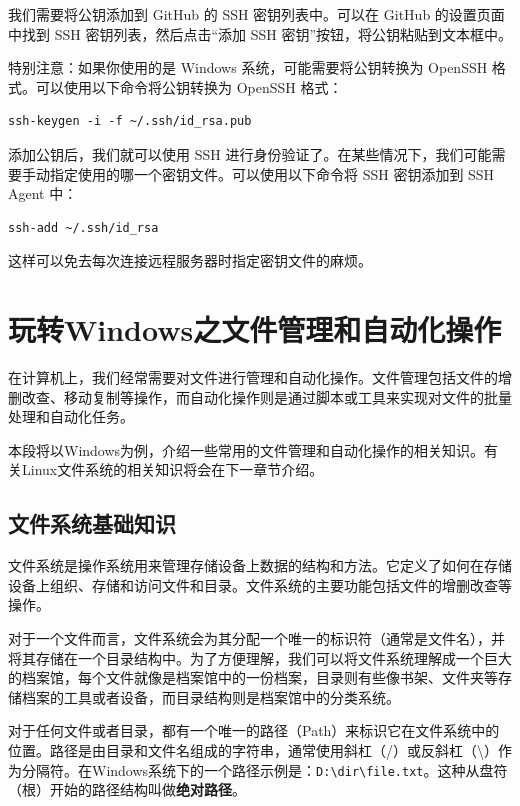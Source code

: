 \documentclass[../main.tex]{subfiles}
\begin{document}
我们需要将公钥添加到 GitHub 的 SSH 密钥列表中。可以在 GitHub 的设置页面中找到 SSH 密钥列表，然后点击“添加 SSH 密钥”按钮，将公钥粘贴到文本框中。

特别注意：如果你使用的是 Windows 系统，可能需要将公钥转换为 OpenSSH 格式。可以使用以下命令将公钥转换为 OpenSSH 格式：
\begin{verbatim}
ssh-keygen -i -f ~/.ssh/id_rsa.pub
\end{verbatim}

添加公钥后，我们就可以使用 SSH 进行身份验证了。在某些情况下，我们可能需要手动指定使用的哪一个密钥文件。可以使用以下命令将 SSH 密钥添加到 SSH Agent 中：
\begin{verbatim}
ssh-add ~/.ssh/id_rsa
\end{verbatim}

这样可以免去每次连接远程服务器时指定密钥文件的麻烦。

\section{玩转Windows之文件管理和自动化操作}\label{sec:windows-file-management}

在计算机上，我们经常需要对文件进行管理和自动化操作。文件管理包括文件的增删改查、移动复制等操作，而自动化操作则是通过脚本或工具来实现对文件的批量处理和自动化任务。

本段将以Windows为例，介绍一些常用的文件管理和自动化操作的相关知识。有关Linux文件系统的相关知识将会在下一章节介绍。

\subsection{文件系统基础知识}

文件系统是操作系统用来管理存储设备上数据的结构和方法。它定义了如何在存储设备上组织、存储和访问文件和目录。文件系统的主要功能包括文件的增删改查等操作。

对于一个文件而言，文件系统会为其分配一个唯一的标识符（通常是文件名），并将其存储在一个目录结构中。为了方便理解，我们可以将文件系统理解成一个巨大的档案馆，每个文件就像是档案馆中的一份档案，目录则有些像书架、文件夹等存储档案的工具或者设备，而目录结构则是档案馆中的分类系统。

对于任何文件或者目录，都有一个唯一的路径（Path）来标识它在文件系统中的位置。路径是由目录和文件名组成的字符串，通常使用斜杠（/）或反斜杠（\textbackslash）作为分隔符。在Windows系统下的一个路径示例是：\texttt{D:\textbackslash dir\textbackslash file.txt}。这种从盘符（根）开始的路径结构叫做\textbf{绝对路径}。
\end{document}
